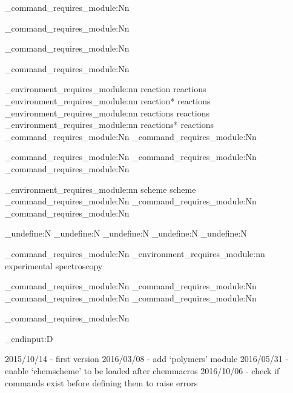 \chemmacros_command_requires_module:Nn 

\chemmacros_command_requires_module:Nn 

\chemmacros_command_requires_module:Nn 

\chemmacros_command_requires_module:Nn 

\chemmacros_environment_requires_module:nn {reaction}       {reactions}
\chemmacros_environment_requires_module:nn {reaction*}      {reactions}
\chemmacros_environment_requires_module:nn {reactions}      {reactions}
\chemmacros_environment_requires_module:nn {reactions*}     {reactions}
\chemmacros_command_requires_module:Nn     
\chemmacros_command_requires_module:Nn     

\chemmacros_command_requires_module:Nn 
\chemmacros_command_requires_module:Nn 
\chemmacros_command_requires_module:Nn 

\chemmacros_environment_requires_module:nn {scheme}        {scheme}
\chemmacros_command_requires_module:Nn     
\chemmacros_command_requires_module:Nn     
\chemmacros_command_requires_module:Nn     

  {
    \cs_undefine:N \scheme
    \cs_undefine:N \endscheme
    \cs_undefine:N \listschemename
    \cs_undefine:N \schemename
    \cs_undefine:N \listofschemes
  }

\chemmacros_command_requires_module:Nn     
\chemmacros_environment_requires_module:nn {experimental} {spectroscopy}

\chemmacros_command_requires_module:Nn 
\chemmacros_command_requires_module:Nn 
\chemmacros_command_requires_module:Nn 
\chemmacros_command_requires_module:Nn 

\chemmacros_command_requires_module:Nn 


\tex_endinput:D

2015/10/14 - first version
2016/03/08 - add `polymers' module
2016/05/31 - enable `chemscheme' to be loaded after chemmacros
2016/10/06 - check if commands exist before defining them to raise errors
